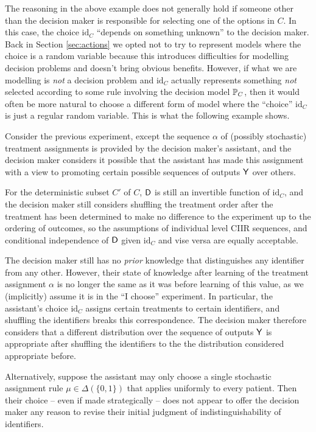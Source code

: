 The reasoning in the above example does not generally hold if someone other than the decision maker is responsible for selecting one of the options in $C$. In this case, the choice $\text{id}_C$ ``depends on something unknown'' to the decision maker. Back in Section \ref{sec:actions} we opted not to try to represent models where the choice is a random variable because this introduces difficulties for modelling decision problems and doesn't bring obvious benefits. However, if what we are modelling is \emph{not} a decision problem and $\text{id}_C$ actually represents something \emph{not} selected according to some rule involving the decision model $\mathbb{P}_C$, then it would often be more natural to choose a different form of model where the ``choice'' $\text{id}_C$ is just a regular random variable. This is what the following example shows.

\begin{example}\label{ex:bad_randomised_experiment}
Consider the previous experiment, except the sequence $\alpha$ of (possibly stochastic) treatment assignments is provided by the decision maker's assistant, and the decision maker considers it possible that the assistant has made this assignment with a view to promoting certain possible sequences of outputs $\mathsf{Y}$ over others.

For the deterministic subset $C'$ of $C$, $\mathsf{D}$ is still an invertible function of $\text{id}_C$, and the decision maker still considers shuffling the treatment order after the treatment has been determined to make no difference to the experiment up to the ordering of outcomes, so the assumptions of individual level CIIR sequences, and conditional independence of $\mathsf{D}$ given $\text{id}_C$ and vise versa are equally acceptable.

The decision maker still has no \emph{prior} knowledge that distinguishes any identifier from any other. However, their state of knowledge after learning of the treatment assignment $\alpha$ is no longer the same as it was before learning of this value, as we (implicitly) assume it is in the  ``I choose'' experiment. In particular, the assistant's choice $\text{id}_C$ assigns certain treatments to certain identifiers, and shuffling the identifiers breaks this correspondence. The decision maker therefore considers that a different distribution over the sequence of outputs $\mathsf{Y}$ is appropriate after shuffling the identifiers to the the distribution considered appropriate before.

Alternatively, suppose the assistant may only choose a single stochastic assignment rule $\mu\in \Delta(\{0,1\})$ that applies uniformly to every patient. Then their choice -- even if made strategically -- does not appear to offer the decision maker any reason to revise their initial judgment of indistinguishability of identifiers.
\end{example}

